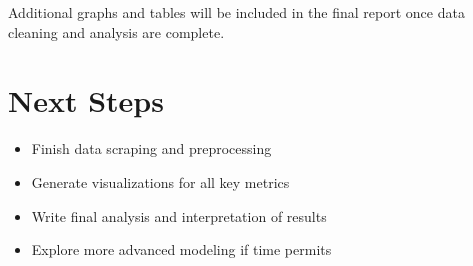 \documentclass[12pt]{article}
\begin{document}
Additional graphs and tables will be included in the final report once data cleaning and analysis are complete.

\section{Next Steps}
\begin{itemize}
    \item Finish data scraping and preprocessing
    \item Generate visualizations for all key metrics
    \item Write final analysis and interpretation of results
    \item Explore more advanced modeling if time permits
\end{itemize}



\end{document}
